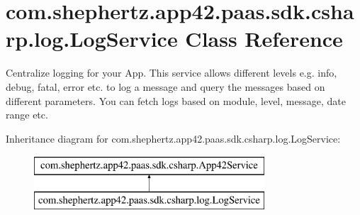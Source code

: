 \hypertarget{classcom_1_1shephertz_1_1app42_1_1paas_1_1sdk_1_1csharp_1_1log_1_1_log_service}{\section{com.\+shephertz.\+app42.\+paas.\+sdk.\+csharp.\+log.\+Log\+Service Class Reference}
\label{classcom_1_1shephertz_1_1app42_1_1paas_1_1sdk_1_1csharp_1_1log_1_1_log_service}
}


Centralize logging for your App. This service allows different levels e.\+g. info, debug, fatal, error etc. to log a message and query the messages based on different parameters. You can fetch logs based on module, level, message, date range etc.  


Inheritance diagram for com.\+shephertz.\+app42.\+paas.\+sdk.\+csharp.\+log.\+Log\+Service\+:\begin{figure}[H]
\begin{center}
\leavevmode
\includegraphics[height=2.000000cm]{classcom_1_1shephertz_1_1app42_1_1paas_1_1sdk_1_1csharp_1_1log_1_1_log_service}
\end{center}
\end{figure}
